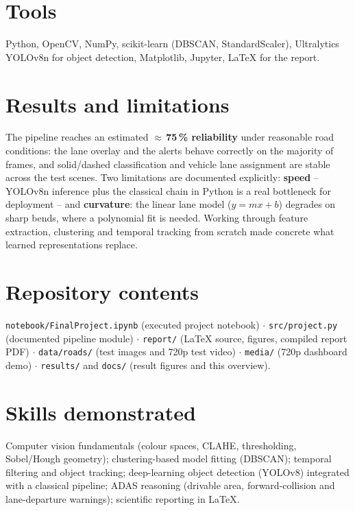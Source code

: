\documentclass[10pt,a4paper]{article}
\begin{document}
\section*{Tools}
Python, OpenCV, NumPy, scikit-learn (DBSCAN, StandardScaler), Ultralytics YOLOv8n for object detection,
Matplotlib, Jupyter, LaTeX for the report.

\section*{Results and limitations}
The pipeline reaches an estimated \textbf{$\approx$\,75\,\% reliability} under reasonable road conditions: the lane
overlay and the alerts behave correctly on the majority of frames, and solid/dashed classification and vehicle lane
assignment are stable across the test scenes. Two limitations are documented explicitly: \textbf{speed} -- YOLOv8n
inference plus the classical chain in Python is a real bottleneck for deployment -- and \textbf{curvature}: the linear
lane model ($y = mx + b$) degrades on sharp bends, where a polynomial fit is needed. Working through feature
extraction, clustering and temporal tracking from scratch made concrete what learned representations replace.

\section*{Repository contents}
\texttt{notebook/FinalProject.ipynb} (executed project notebook) $\cdot$ \texttt{src/project.py} (documented pipeline
module) $\cdot$ \texttt{report/} (LaTeX source, figures, compiled report PDF) $\cdot$ \texttt{data/roads/} (test
images and 720p test video) $\cdot$ \texttt{media/} (720p dashboard demo) $\cdot$ \texttt{results/} and
\texttt{docs/} (result figures and this overview).

\section*{Skills demonstrated}
Computer vision fundamentals (colour spaces, CLAHE, thresholding, Sobel/Hough geometry); clustering-based model
fitting (DBSCAN); temporal filtering and object tracking; deep-learning object detection (YOLOv8) integrated with a
classical pipeline; ADAS reasoning (drivable area, forward-collision and lane-departure warnings); scientific
reporting in LaTeX.
\end{document}

